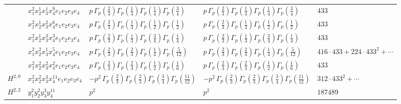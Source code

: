 \documentclass[11pt]{article}
\begin{document}
\begin{table}[ht]
{\begin{tabular}{@{}lllll@{}}
 & $x_{1}^{2} x_{2}^{1} x_{3}^{1} x_{4}^{9}  e_{1} e_{2} e_{3} e_{4}$ & $p \, \Gamma_p \left( \frac{2}{3} \right) \Gamma_p \left( \frac{1}{3} \right) \Gamma_p \left( \frac{1}{4} \right) \Gamma_p \left( \frac{3}{4} \right)$ & $p \, \Gamma_p \left( \frac{2}{3} \right) \Gamma_p \left( \frac{1}{3} \right) \Gamma_p \left( \frac{1}{4} \right) \Gamma_p \left( \frac{3}{4} \right)$ & $433$ \\
 & $x_{1}^{2} x_{2}^{1} x_{3}^{2} x_{4}^{6}  e_{1} e_{2} e_{3} e_{4}$ & $p \, \Gamma_p \left( \frac{2}{3} \right) \Gamma_p \left( \frac{1}{3} \right) \Gamma_p \left( \frac{1}{2} \right) \Gamma_p \left( \frac{1}{2} \right)$ & $p \, \Gamma_p \left( \frac{2}{3} \right) \Gamma_p \left( \frac{1}{3} \right) \Gamma_p \left( \frac{1}{2} \right) \Gamma_p \left( \frac{1}{2} \right)$ & $433$ \\
 & $x_{1}^{2} x_{2}^{1} x_{3}^{3} x_{4}^{3}  e_{1} e_{2} e_{3} e_{4}$ & $p \, \Gamma_p \left( \frac{2}{3} \right) \Gamma_p \left( \frac{1}{3} \right) \Gamma_p \left( \frac{3}{4} \right) \Gamma_p \left( \frac{1}{4} \right)$ & $p \, \Gamma_p \left( \frac{2}{3} \right) \Gamma_p \left( \frac{1}{3} \right) \Gamma_p \left( \frac{3}{4} \right) \Gamma_p \left( \frac{1}{4} \right)$ & $433$ \\
 & $x_{1}^{2} x_{2}^{2} x_{3}^{1} x_{4}^{5}  e_{1} e_{2} e_{3} e_{4}$ & $p \, \Gamma_p \left( \frac{2}{3} \right) \Gamma_p \left( \frac{2}{3} \right) \Gamma_p \left( \frac{1}{4} \right) \Gamma_p \left( \frac{5}{12} \right)$ & $p \, \Gamma_p \left( \frac{2}{3} \right) \Gamma_p \left( \frac{2}{3} \right) \Gamma_p \left( \frac{1}{4} \right) \Gamma_p \left( \frac{5}{12} \right)$ & $416{\cdot}433{+}224{\cdot}433^{2}{+}\cdots$ \\
 & $x_{1}^{2} x_{2}^{2} x_{3}^{2} x_{4}^{2}  e_{1} e_{2} e_{3} e_{4}$ & $p \, \Gamma_p \left( \frac{2}{3} \right) \Gamma_p \left( \frac{2}{3} \right) \Gamma_p \left( \frac{1}{2} \right) \Gamma_p \left( \frac{1}{6} \right)$ & $p \, \Gamma_p \left( \frac{2}{3} \right) \Gamma_p \left( \frac{2}{3} \right) \Gamma_p \left( \frac{1}{2} \right) \Gamma_p \left( \frac{1}{6} \right)$ & $433$ \\
\midrule
$H^{2,0}$ & $x_{1}^{2} x_{2}^{2} x_{3}^{3} x_{4}^{11}  e_{1} e_{2} e_{3} e_{4}$ & $- p^{2} \, \Gamma_p \left( \frac{2}{3} \right) \Gamma_p \left( \frac{2}{3} \right) \Gamma_p \left( \frac{3}{4} \right) \Gamma_p \left( \frac{11}{12} \right)$ & $- p^{2} \, \Gamma_p \left( \frac{2}{3} \right) \Gamma_p \left( \frac{2}{3} \right) \Gamma_p \left( \frac{3}{4} \right) \Gamma_p \left( \frac{11}{12} \right)$ & $312{\cdot}433^{2}{+}\cdots$ \\
\midrule
$H^{2,2}$ & $y_{1}^{2} y_{2}^{2} y_{3}^{3} y_{4}^{11}$ & $p^{2} \,$ & $p^{2} \,$ & $187489$ \\
\bottomrule
\end{tabular}
}
\renewcommand{\arraystretch}{1.0}
\end{table}
\end{document}
